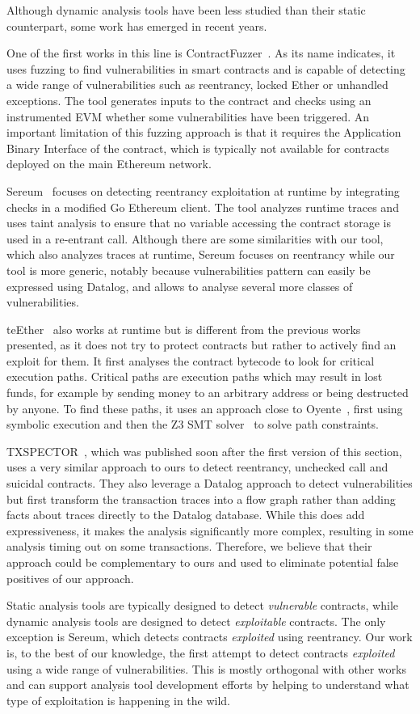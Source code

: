  Although dynamic analysis tools have been less studied than their static counterpart, some work has emerged in recent years.

One of the first works in this line is ContractFuzzer~\cite{Jiang2018}.
As its name indicates, it uses fuzzing to find vulnerabilities in smart contracts and is capable of detecting a wide range of vulnerabilities such as reentrancy, locked Ether or unhandled exceptions.
The tool generates inputs to the contract and checks using an instrumented EVM whether some vulnerabilities have been triggered.
An important limitation of this fuzzing approach is that it requires the Application Binary Interface of the contract, which is typically not available for contracts deployed on the main Ethereum network.

Sereum~\cite{Rodler2019} focuses on detecting reentrancy exploitation at runtime by integrating checks in a modified Go Ethereum client.
The tool analyzes runtime traces and uses taint analysis to ensure that no variable accessing the contract storage is used in a re-entrant call.
Although there are some similarities with our tool, which also analyzes traces at runtime, Sereum focuses on reentrancy while our tool is more generic, notably because vulnerabilities pattern can easily be expressed using Datalog, and allows to analyse several more classes of vulnerabilities.

teEther~\cite{Krupp2018} also works at runtime but is different from the previous works presented, as it does not try to protect contracts but rather to actively find an exploit for them. It first analyses the contract bytecode to look for critical execution paths.
Critical paths are execution paths which may result in lost funds, for example by sending money to an arbitrary address or being destructed by anyone.
To find these paths, it uses an approach close to Oyente~\cite{luu2016a}, first using symbolic execution and then the Z3 SMT solver~\cite{de2008z3} to solve path constraints.

TXSPECTOR~\cite{255340}, which was published soon after the first version of this section, uses a very similar approach to ours to detect reentrancy, unchecked call and suicidal contracts.
They also leverage a Datalog approach to detect vulnerabilities but first transform the transaction traces into a flow graph rather than adding facts about traces directly to the Datalog database.
While this does add expressiveness, it makes the analysis significantly more complex, resulting in some analysis timing out on some transactions. Therefore, we believe that their approach could be complementary to ours and used to eliminate potential false positives of our approach.

 Static analysis tools are typically designed to detect \emph{vulnerable} contracts, while dynamic analysis tools are designed to detect \emph{exploitable} contracts. The only exception is Sereum, which detects contracts \emph{exploited} using reentrancy.
Our work is, to the best of our knowledge, the first attempt to detect contracts \emph{exploited} using a wide range of vulnerabilities.
This is mostly orthogonal with other works and can support analysis tool development efforts by helping to understand what type of exploitation is happening in the wild.
